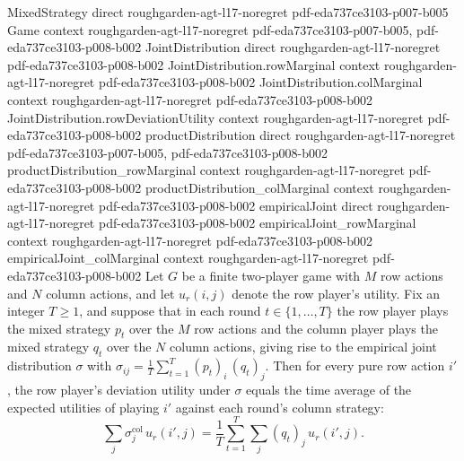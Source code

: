 \begin{lemma}
\label{empiricalJoint_rowDeviationUtility}
\leanok
{}
\proofstep
  {MixedStrategy}
  {direct}
  {roughgarden-agt-l17-noregret}
  {pdf-eda737ce3103-p007-b005}
\proofstep
  {Game}
  {context}
  {roughgarden-agt-l17-noregret}
  {pdf-eda737ce3103-p007-b005,
    pdf-eda737ce3103-p008-b002}
\proofstep
  {JointDistribution}
  {direct}
  {roughgarden-agt-l17-noregret}
  {pdf-eda737ce3103-p008-b002}
\proofstep
  {JointDistribution.rowMarginal}
  {context}
  {roughgarden-agt-l17-noregret}
  {pdf-eda737ce3103-p008-b002}
\proofstep
  {JointDistribution.colMarginal}
  {context}
  {roughgarden-agt-l17-noregret}
  {pdf-eda737ce3103-p008-b002}
\proofstep
  {JointDistribution.rowDeviationUtility}
  {context}
  {roughgarden-agt-l17-noregret}
  {pdf-eda737ce3103-p008-b002}
\proofstep
  {productDistribution}
  {direct}
  {roughgarden-agt-l17-noregret}
  {pdf-eda737ce3103-p007-b005,
    pdf-eda737ce3103-p008-b002}
\proofstep
  {productDistribution_rowMarginal}
  {context}
  {roughgarden-agt-l17-noregret}
  {pdf-eda737ce3103-p008-b002}
\proofstep
  {productDistribution_colMarginal}
  {context}
  {roughgarden-agt-l17-noregret}
  {pdf-eda737ce3103-p008-b002}
\proofstep
  {empiricalJoint}
  {direct}
  {roughgarden-agt-l17-noregret}
  {pdf-eda737ce3103-p008-b002}
\proofstep
  {empiricalJoint_rowMarginal}
  {context}
  {roughgarden-agt-l17-noregret}
  {pdf-eda737ce3103-p008-b002}
\proofstep
  {empiricalJoint_colMarginal}
  {context}
  {roughgarden-agt-l17-noregret}
  {pdf-eda737ce3103-p008-b002}
Let $G$ be a finite two-player game with $M$ row actions and $N$ column actions, and let
$u_r(i,j)$ denote the row player's utility. Fix an integer $T \ge 1$, and suppose that
in each round $t \in \{1,\dots,T\}$ the row player plays the mixed strategy $p_t$ over
the $M$ row actions and the column player plays the mixed strategy $q_t$ over the $N$
column actions, giving rise to the empirical joint distribution $\sigma$ with
$\sigma_{ij} = \tfrac{1}{T}\sum_{t=1}^{T} (p_t)_i\,(q_t)_j$. Then for every pure row
action $i'$, the row player's deviation utility under $\sigma$ equals the time average
of the expected utilities of playing $i'$ against each round's column strategy:
\[
  \sum_{j} \sigma^{\mathrm{col}}_j\, u_r(i',j)
  = \frac{1}{T}\sum_{t=1}^{T}\sum_{j} (q_t)_j\, u_r(i',j).
\]
\end{lemma}

